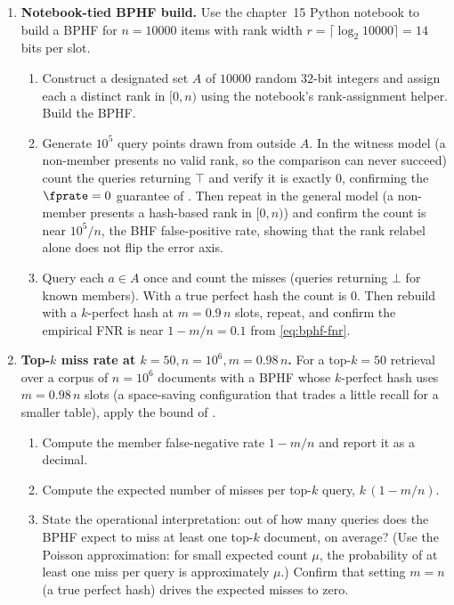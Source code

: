 \begin{enumerate}

\item \exstarstar
\label{ex:ch15-4}
\textbf{Notebook-tied BPHF build.}
Use the chapter~15 Python notebook to build a BPHF for $n = 10000$
items with rank width $r = \lceil \log_2 10000 \rceil = 14$ bits per
slot.
\begin{enumerate}
  \item[(a)] Construct a designated set $A$ of $10000$ random
    $32$-bit integers and assign each a distinct rank in $[0, n)$
    using the notebook's rank-assignment helper. Build the BPHF.
  \item[(b)] Generate $10^5$ query points drawn from outside $A$.
    In the witness model (a non-member presents no valid rank, so the
    comparison can never succeed) count the queries returning $\top$
    and verify it is exactly $0$, confirming the $\fprate = 0$
    guarantee of . Then repeat in the general model (a
    non-member presents a hash-based rank in $[0, n)$) and confirm the
    count is near $10^5 / n$, the BHF false-positive rate, showing
    that the rank relabel alone does not flip the error axis.
  \item[(c)] Query each $a \in A$ once and count the misses (queries
    returning $\bot$ for known members). With a true perfect hash the
    count is $0$. Then rebuild with a $k$-perfect hash at $m = 0.9\,n$
    slots, repeat, and confirm the empirical FNR is near
    $1 - m/n = 0.1$ from \eqref{eq:bphf-fnr}.
\end{enumerate}

\item \exstarstar
\label{ex:ch15-5}
\textbf{Top-$k$ miss rate at $k = 50, n = 10^6, m = 0.98\,n$.}
For a top-$k = 50$ retrieval over a corpus of $n = 10^6$ documents
with a BPHF whose $k$-perfect hash uses $m = 0.98\,n$ slots (a
space-saving configuration that trades a little recall for a smaller
table), apply the bound of .
\begin{enumerate}
  \item[(a)] Compute the member false-negative rate $1 - m/n$ and
    report it as a decimal.
  \item[(b)] Compute the expected number of misses per top-$k$
    query, $k\,(1 - m/n)$.
  \item[(c)] State the operational interpretation: out of how many
    queries does the BPHF expect to miss at least one top-$k$
    document, on average? (Use the Poisson approximation: for small
    expected count $\mu$, the probability of at least one miss per
    query is approximately $\mu$.) Confirm that setting $m = n$ (a
    true perfect hash) drives the expected misses to zero.
\end{enumerate}


\end{enumerate}

